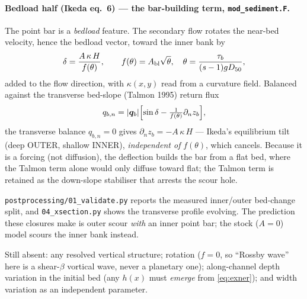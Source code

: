\documentclass[11pt,a4paper]{article}
\newcommand{\dn}{\partial_n}
\newcommand{\code}[1]{\texttt{\small #1}}
\begin{document}
\paragraph{Bedload half (Ikeda eq.~6) --- the bar-building term, \code{mod\_sediment.F}.}
The point bar is a \emph{bedload} feature. The secondary flow rotates the near-bed velocity,
hence the bedload vector, toward the inner bank by
\begin{equation}
  \delta=\frac{A\,\kappa\,H}{f(\theta)},\qquad f(\theta)=A_{\rm bl}\sqrt\theta,\quad
  \theta=\frac{\tau_b}{(s-1)gD_{50}},
  \label{eq:secondary}
\end{equation}
added to the flow direction, with $\kappa(x,y)$ read from a curvature field. Balanced against
the transverse bed-slope (Talmon 1995) return flux
\begin{equation}
  q_{b,n}=|\bm q_b|\Bigl[\sin\delta-\tfrac{1}{f(\theta)}\dn z_b\Bigr],
  \label{eq:slopedefl}
\end{equation}
the transverse balance $q_{b,n}=0$ gives $\dn z_b=-A\,\kappa\,H$ --- Ikeda's equilibrium tilt
(deep OUTER, shallow INNER), \emph{independent of} $f(\theta)$, which cancels. Because it is a
forcing (not diffusion), the deflection builds the bar from a flat bed, where the Talmon term
alone would only diffuse toward flat; the Talmon term is retained as the down-slope stabiliser
that arrests the scour hole.

\code{postprocessing/01\_validate.py} reports the measured inner/outer bed-change split, and
\code{04\_xsection.py} shows the transverse profile evolving. The prediction these closures
make is outer scour \emph{with} an inner point bar; the stock ($A=0$) model scours the inner
bank instead.

Still absent: any resolved vertical structure; rotation ($f=0$, so ``Rossby wave'' here is a
shear-$\beta$ vortical wave, never a planetary one); along-channel depth variation in the
initial bed (any $h(x)$ must \emph{emerge} from \eqref{eq:exner}); and width variation as an
independent parameter.
\end{document}
